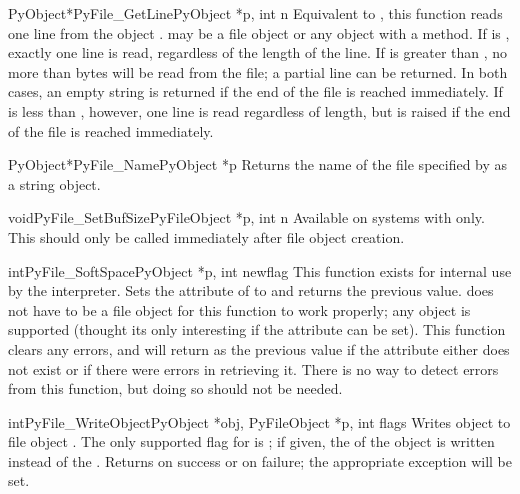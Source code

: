 \documentclass{manual}
\begin{document}
\begin{cfuncdesc}{PyObject*}{PyFile_GetLine}{PyObject *p, int n}
Equivalent to , this
function reads one line from the object .   may be a
file object or any object with a  method.  If
 is , exactly one line is read, regardless of the
length of the line.  If  is greater than , no more than 
 bytes will be read from the file; a partial line can be
returned.  In both cases, an empty string is returned if the end of
the file is reached immediately.  If  is less than ,
however, one line is read regardless of length, but
 is raised if the end of the file is reached
immediately.
\end{cfuncdesc}

\begin{cfuncdesc}{PyObject*}{PyFile_Name}{PyObject *p}
Returns the name of the file specified by  as a string object.
\end{cfuncdesc}

\begin{cfuncdesc}{void}{PyFile_SetBufSize}{PyFileObject *p, int n}
Available on systems with 
only.  This should only be called immediately after file object
creation.
\end{cfuncdesc}

\begin{cfuncdesc}{int}{PyFile_SoftSpace}{PyObject *p, int newflag}
This function exists for internal use by the interpreter.
Sets the  attribute of  to  and
returns the
previous value.   does not have to be a file object
for this function to work properly; any object is supported (thought
its only interesting if the  attribute can be set).
This function clears any errors, and will return  as the
previous value if the attribute either does not exist or if there were
errors in retrieving it.  There is no way to detect errors from this
function, but doing so should not be needed.
\end{cfuncdesc}

\begin{cfuncdesc}{int}{PyFile_WriteObject}{PyObject *obj, PyFileObject *p,
                                           int flags}
Writes object  to file object .  The only supported
flag for  is ;
if given, the  of the object is written instead of the 
.  Returns  on success or  on
failure; the appropriate exception will be set.
\end{cfuncdesc}
\end{document}
